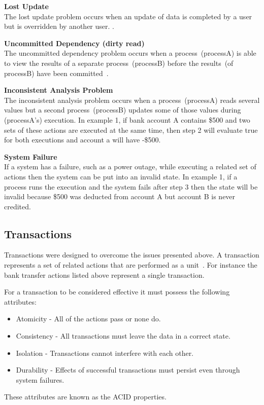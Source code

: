 \documentclass[a4paper,12pt]{article}
\begin{document}
\par\textbf{\indent Lost Update}\\
The lost update problem occurs when an update of data is completed by a user but is overridden by another user.
\citep{database-systems}.

\par\textbf{\indent Uncommitted Dependency (dirty read)}\\
The uncommitted dependency problem occurs when a process~(processA) is able to view the results of a separate process~(processB) before the results~(of processB) have been committed~\citep{database-systems}.

\par\textbf{\indent Inconsistent Analysis Problem}\\
The inconsistent analysis problem occurs when a process~(processA) reads several values but a second process~(processB) updates some of those values during (processA's) execution.
In example 1, if bank account A contains \$500 and two sets of these actions are executed at the same time, then step 2 will evaluate true for both executions and account a will have -\$500.

\par\textbf{\indent System Failure}\\
If a system has a failure, such as a power outage, while executing a related set of actions then the system can be put into an invalid state. 
In example 1, if a process runs the execution and the system fails after step 3 then the state will be invalid because \$500 was deducted from account A but account B is never credited.


\subsection*{Transactions}
Transactions were designed to overcome the issues presented above.
A transaction represents a set of related actions that are performed as a unit~\citep{nested-transactions}.
For instance the bank transfer actions listed above represent a single transaction. 

For a transaction to be considered effective it must possess the following attributes:
\begin{itemize} 
    \item{Atomicity - All of the actions pass or none do.}
    \item{Consistency - All transactions must leave the data in a correct state.}
    \item{Isolation - Transactions cannot interfere with each other.}
    \item{Durability - Effects of successful transactions must persist even through system failures.}
\end{itemize}
These attributes are known as the ACID properties.
\end{document}
